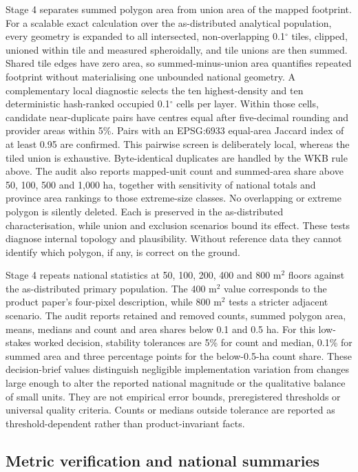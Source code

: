 \documentclass[pdflatex,sn-basic]{sn-jnl}
\begin{document}
Stage 4 separates summed polygon area from union area of the mapped footprint. For a scalable exact calculation over the as-distributed analytical population, every geometry is expanded to all intersected, non-overlapping 0.1$^{\circ}$ tiles, clipped, unioned within tile and measured spheroidally, and tile unions are then summed. Shared tile edges have zero area, so summed-minus-union area quantifies repeated footprint without materialising one unbounded national geometry. A complementary local diagnostic selects the ten highest-density and ten deterministic hash-ranked occupied 0.1$^{\circ}$ cells per layer. Within those cells, candidate near-duplicate pairs have centres equal after five-decimal rounding and provider areas within 5\%. Pairs with an EPSG:6933 equal-area Jaccard index of at least 0.95 are confirmed. This pairwise screen is deliberately local, whereas the tiled union is exhaustive. Byte-identical duplicates are handled by the WKB rule above. The audit also reports mapped-unit count and summed-area share above 50, 100, 500 and 1,000 ha, together with sensitivity of national totals and province area rankings to those extreme-size classes. No overlapping or extreme polygon is silently deleted. Each is preserved in the as-distributed characterisation, while union and exclusion scenarios bound its effect. These tests diagnose internal topology and plausibility. Without reference data they cannot identify which polygon, if any, is correct on the ground.

Stage 4 repeats national statistics at 50, 100, 200, 400 and 800 m$^{2}$ floors against the as-distributed primary population. The 400 m$^{2}$ value corresponds to the product paper's four-pixel description, while 800 m$^{2}$ tests a stricter adjacent scenario. The audit reports retained and removed counts, summed polygon area, means, medians and count and area shares below 0.1 and 0.5 ha. For this low-stakes worked decision, stability tolerances are 5\% for count and median, 0.1\% for summed area and three percentage points for the below-0.5-ha count share. These decision-brief values distinguish negligible implementation variation from changes large enough to alter the reported national magnitude or the qualitative balance of small units. They are not empirical error bounds, preregistered thresholds or universal quality criteria. Counts or medians outside tolerance are reported as threshold-dependent rather than product-invariant facts.

\subsection{Metric verification and national summaries}\label{subsec:metrics}
\end{document}
